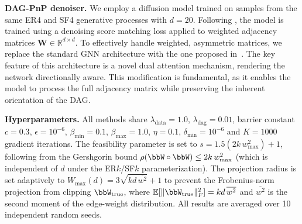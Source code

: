 \documentclass[conference]{IEEEtran}
\newcommand{\Ldata}{\ccalL_{\mathrm{data}}}
\newcommand{\sms}[1]{{\color{cyan}{[SS: #1]}}}
\begin{document}
    \vspace{1mm}
	\noindent\textbf{DAG-PnP denoiser.}
    We employ a diffusion model trained on samples from the same ER4 and SF4 generative processes with $d=20$. Following %
    \cite{jo2022score}, the model is trained using a denoising score matching loss \cite{vincent2011connection} applied to weighted adjacency matrices $\mathbf{W} \in \mathbb{R}^{d \times d}$. To effectively handle weighted, asymmetric matrices, we replace the standard GNN architecture with the one proposed in~\cite{carballo2025generating}. The key feature of this architecture is a novel dual attention mechanism, rendering the network directionally aware. This modification is fundamental, as it enables the model to process the full adjacency matrix while preserving the inherent orientation of the DAG.
    
    \vspace{1mm}
	\noindent\textbf{Hyperparameters.}  
    All methods share $\lambda_{\mathrm{data}}=1.0$, $\lambda_{\mathrm{dag}}=0.01$,
    barrier constant $c = 0.3$, $\epsilon = 10^{-6}$,
    {$\beta_{\min}=0.1$, $\beta_{\max}=1.0$}, $\eta=0.1$, $\delta_{\min}=10^{-6}$ and $K=1000$ gradient iterations. 
    The feasibility parameter is set to $s = 1.5(2k\,w_{\max}^2) + 1$, following
    from the Gershgorin bound $\rho(\bbW\circ\bbW)\le 2k\,w_{\max}^2$ (which is
    {independent of $d$} under the ER$k$/SF$k$ parameterization).
    The projection radius is set adaptively to $W_{\max}(d) = 3\sqrt{kd\,\overline{w^2}} + 1$
    to prevent the Frobenius-norm projection from clipping $\bbW_{\mathrm{true}}$,
    where $\mathbb{E}[\|\bbW_{\mathrm{true}}\|_F^2] = kd\,\overline{w^2}$ and
    $\overline{w^2}$ is the %
    second moment of the edge-weight distribution.
    All results are averaged over 10 independent random seeds.
    
\end{document}
